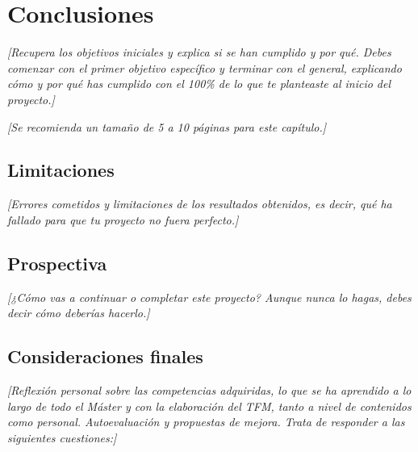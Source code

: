
\chapter{Conclusiones}

\label{Chapter6}


\textit{[Recupera los objetivos iniciales y explica si se han cumplido y por qué. Debes comenzar con el primer objetivo específico y terminar con el general, explicando cómo y por qué has cumplido con el 100\% de lo que te planteaste al inicio del proyecto.]}

\textit{[Se recomienda un tamaño de 5 a 10 páginas para este capítulo.]}


\section{Limitaciones}

\textit{[Errores cometidos y limitaciones de los resultados obtenidos, es decir, qué ha fallado para que tu proyecto no fuera perfecto.]}


\section{Prospectiva}

\textit{[¿Cómo vas a continuar o completar este proyecto? Aunque nunca lo hagas, debes decir cómo deberías hacerlo.]}


\section{Consideraciones finales}

\textit{[Reflexión personal sobre las competencias adquiridas, lo que se ha aprendido a lo largo de todo el Máster y con la elaboración del TFM, tanto a nivel de contenidos como personal. Autoevaluación y propuestas de mejora. Trata de responder a las siguientes cuestiones:]}

